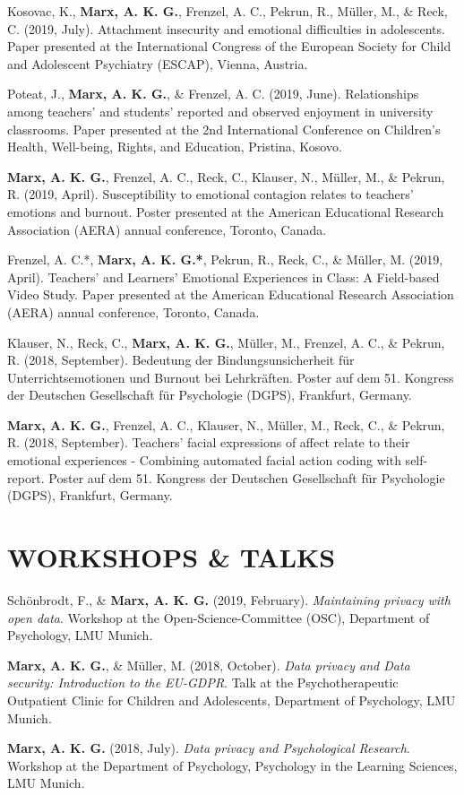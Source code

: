 \documentclass[letterpaper]{article}
\renewenvironment{itemize}{ %
  \begin{list}{}{ %
    \setlength{\leftmargin}{2.5em} %
  }
}{
  \end{list}
}
\begin{document}
\begin{itemize}
\item Kosovac, K., {\bf Marx, A. K. G.}, Frenzel, A. C., Pekrun, R., Müller, M., \& Reck, C. (2019, July). Attachment insecurity and emotional difficulties in adolescents. Paper presented at the International Congress of the European Society for Child and Adolescent Psychiatry (ESCAP), Vienna, Austria.
\item Poteat, J., {\bf Marx, A. K. G.}, \& Frenzel, A. C. (2019, June). Relationships among teachers' and students' reported and observed enjoyment in university classrooms. Paper presented at the 2nd International Conference on Children's Health, Well-being, Rights, and Education, Pristina, Kosovo.
\item {\bf Marx, A. K. G.}, Frenzel, A. C., Reck, C., Klauser, N., Müller, M., \& Pekrun, R. (2019, April). Susceptibility to emotional contagion relates to teachers' emotions and burnout. Poster presented at the American Educational Research Association (AERA) annual conference, Toronto, Canada.
\item Frenzel, A. C.*, {\bf Marx, A. K. G.*}, Pekrun, R., Reck, C., \& Müller, M. (2019, April). Teachers’ and Learners’ Emotional Experiences in Class: A Field-based Video Study. Paper presented at the American Educational Research Association (AERA) annual conference, Toronto, Canada.
\item Klauser, N., Reck, C., {\bf Marx, A. K. G.}, Müller, M., Frenzel, A. C., \& Pekrun, R. (2018, September). Bedeutung der Bindungsunsicherheit für Unterrichtsemotionen und Burnout bei Lehrkräften. Poster auf dem 51. Kongress der Deutschen Gesellschaft für Psychologie (DGPS), Frankfurt, Germany.
\item {\bf Marx, A. K. G.}, Frenzel, A. C., Klauser, N., Müller, M., Reck, C., \& Pekrun, R. (2018, September). Teachers' facial expressions of affect relate to their emotional experiences - Combining automated facial action coding with self-report. Poster auf dem 51. Kongress der Deutschen Gesellschaft für Psychologie (DGPS), Frankfurt, Germany.
\item{}
\end{itemize}


\section*{WORKSHOPS \& TALKS}
\begin{itemize}
\item Schönbrodt, F., \& {\bf Marx, A. K. G.} (2019, February). {\it Maintaining privacy with open data}. Workshop at the Open-Science-Committee (OSC), Department of Psychology, LMU Munich.
\item {\bf Marx, A. K. G.}, \& Müller, M. (2018, October). {\it Data privacy and Data security: Introduction to the EU-GDPR}. Talk at the Psychotherapeutic Outpatient Clinic for Children and Adolescents, Department of Psychology, LMU Munich.
\item {\bf Marx, A. K. G.} (2018, July). {\it Data privacy and Psychological Research}. Workshop at the Department of Psychology, Psychology in the Learning Sciences, LMU Munich.
\end{itemize}
\end{document}
